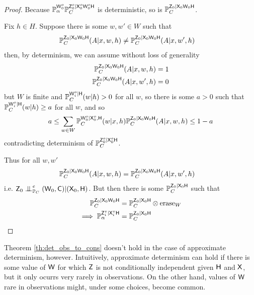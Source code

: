 \begin{proof}
Because $\mathbb{P}_\alpha^{\mathsf{W}_0^o}\mathbb{P}_C^{\mathsf{Z}^o_0|\mathsf{X}^o_0\mathsf{W}^o_0\mathsf{H}}$ is deterministic, so is $\mathbb{P}_C^{\mathsf{Z}_0|\mathsf{X}_0\mathsf{W}_0\mathsf{H}}$.

Fix $h\in H$.  Suppose there is some $w,w'\in W$ such that
\begin{align}
    \mathbb{P}_C^{\mathsf{Z}_0|\mathsf{X}_0\mathsf{W}_0\mathsf{H}}(A|x,w,h) &\neq \mathbb{P}_C^{\mathsf{Z}_0|\mathsf{X}_0\mathsf{W}_0\mathsf{H}}(A|x,w',h)
\end{align}
then, by determinism, we can assume without loss of generality
\begin{align}
    \mathbb{P}_C^{\mathsf{Z}_0|\mathsf{X}_0\mathsf{W}_0\mathsf{H}}(A|x,w,h) = 1\\
    \mathbb{P}_C^{\mathsf{Z}_0|\mathsf{X}_0\mathsf{W}_0\mathsf{H}}(A|x,w',h) = 0
\end{align}
but $W$ is finite and $\mathbb{P}_C^{\mathsf{W}^o_i|\mathsf{H}}(w|h)>0$ for all $w$, so there is some $a>0$ such that $\mathbb{P}_C^{\mathsf{W}^o_i|\mathsf{H}}(w|h)\geq a$ for all $w$, and so
\begin{align}
    a \leq \sum_{w\in W} \mathbb{P}_C^{\mathsf{W}^o_0|\mathsf{X}^o_0,\mathsf{H}}(w|x,h)\mathbb{P}_C^{\mathsf{Z}_0|\mathsf{X}_0\mathsf{W}_0\mathsf{H}}(A|x,w,h)\leq 1-a
\end{align}
contradicting determinism of $\mathbb{P}_C^{\mathsf{Z}^o_0|\mathsf{X}^o_0\mathsf{H}}$.

Thus for all $w,w'$
\begin{align}
    \mathbb{P}_C^{\mathsf{Z}_0|\mathsf{X}_0\mathsf{W}_0\mathsf{H}}(A|x,w,h) &= \mathbb{P}_C^{\mathsf{Z}_0|\mathsf{X}_0\mathsf{W}_0\mathsf{H}}(A|x,w',h)
\end{align}
i.e. $\RV{Z}_0\CI^e_{\prob{P}_C} (\RV{W}_0,\RV{C})|(\RV{X}_0,\RV{H})$. But then there is some $\mathbb{P}_C^{\mathsf{Z}_0|\mathsf{X}_0\mathsf{H}}$ such that
\begin{align}
    \mathbb{P}_C^{\mathsf{Z}_0|\mathsf{X}_0\mathsf{W}_0\mathsf{H}} &= \mathbb{P}_C^{\mathsf{Z}_0|\mathsf{X}_0\mathsf{H}}\otimes \text{erase}_W\\
    \implies \mathbb{P}_\alpha^{\mathsf{Z}^v_i|\mathsf{X}^v_i\mathsf{H}} &= \mathbb{P}_C^{\mathsf{Z}_0|\mathsf{X}_0\mathsf{H}}
\end{align}
\end{proof}

Theorem \ref{th:det_obs_to_cons} doesn't hold in the case of approximate determinism, however. Intuitively, approximate determinism can hold if there is some value of $\mathsf{W}$ for which $\mathsf{Z}$ is not conditionally independent given $\mathsf{H}$ and $\mathsf{X}$, but it only ocurrs very rarely in observations. On the other hand, values of $\mathsf{W}$ rare in observations might, under some choices, become common. 


